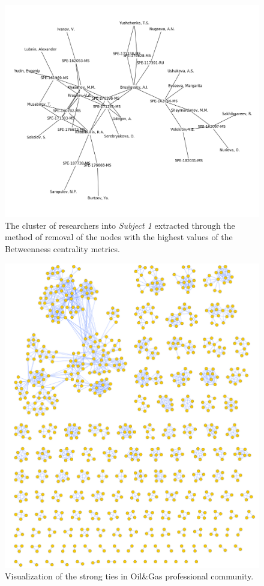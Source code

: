 \documentclass[12pt]{report}
\theoremstyle{definition}
\begin{document}
\begin{figure}[!ht]
	\centering
	\includegraphics[width=\textwidth]{allo6eng.png}
	\caption{The cluster of researchers into \textit{Subject 1} extracted through the method of removal of the nodes with the highest values of the Betweenness centrality metrics.}
	\label{fig:allo6}
\end{figure}

\begin{figure}[ht]
	\centering	
	\includegraphics[width=1.0\textwidth]{wt1eng}
	\caption{Visualization of the strong ties in  Oil\&Gas professional community.}
	\label{fig:wt1}
\end{figure}
\end{document}
